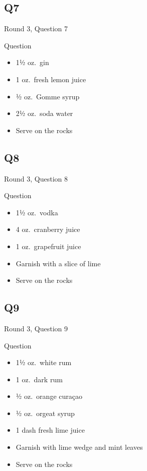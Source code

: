 \documentclass[11pt]{beamer}
\begin{document}
\subsection*{Q7}
\begin{frame}[t]{Round 3, Question 7}
\begin{block}{Question}
\begin{itemize}
\item 1½ oz.\ gin
\item 1 oz.\ fresh lemon juice
\item ½ oz.\ Gomme syrup
\item 2½ oz.\ soda water
\item Serve on the rocks
\end{itemize}
\end{block}
\end{frame}
\subsection*{Q8}
\begin{frame}[t]{Round 3, Question 8}
\begin{block}{Question}
\begin{itemize}
\item 1½ oz.\ vodka
\item 4 oz.\ cranberry juice
\item 1 oz.\ grapefruit juice
\item Garnish with a slice of lime
\item Serve on the rocks
\end{itemize}
\end{block}
\end{frame}
\subsection*{Q9}
\begin{frame}[t]{Round 3, Question 9}
\begin{block}{Question}
\begin{itemize}
\item 1½ oz.\ white rum
\item 1 oz.\ dark rum
\item ½ oz.\ orange curaçao
\item ½ oz.\ orgeat syrup
\item 1 dash fresh lime juice
\item Garnish with lime wedge and mint leaves
\item Serve on the rocks
\end{itemize}
\end{block}
\end{frame}
\end{document}
